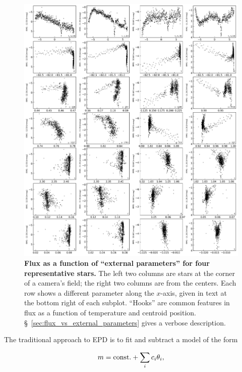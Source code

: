 \documentclass[12pt,twocolumn,tighten]{aastex62}
\begin{document}
\begin{figure}[t]
    \begin{center}
		\includegraphics[height=0.97\textheight]{f4.png}
    \end{center}
    \vspace{-0.8cm}
    \caption{
      {\bf Flux as a function of ``external parameters'' for four
      representative stars.} The left two columns are stars at the
      corner of a camera's field; the right two columns are from the
      centers.
      Each row shows a different parameter along the $x$-axis, given
      in text at the bottom right of each subplot.
      ``Hooks'' are common features in flux as a function of
      temperature and centroid position.
      \S~\ref{sec:flux_vs_external_parameters} gives a verbose
      description.
     \label{fig:flux_vs_external_parameters}
    }
\end{figure}

The traditional approach to EPD 
\citep[][]{Pal_2009,bakos_2010,zhang_precision_2016} is to fit and
subtract a model of the form

\begin{equation}
  m = {\rm const.} + \sum_i c_i \theta_i,
  \label{eq:classical_EPD}
\end{equation}
\end{document}
